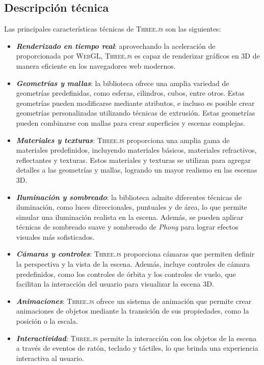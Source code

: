 \documentclass[a4paper, 11pt]{book}
\begin{document}
\subsection{Descripción técnica}
Las principales características técnicas de \textsc{Three.js} son las siguientes:
\begin{itemize}
	\item \textbf{\emph{Renderizado en tiempo real}}: aprovechando la aceleración de \emph{} proporcionada por \textsc{WebGL}, \textsc{Three.js} es capaz de renderizar gráficos en \textsc{3D} de manera eficiente en los navegadores web modernos.
	\item \textbf{\emph{Geometrías y mallas}}: la biblioteca ofrece una amplia variedad de geometrías predefinidas, como esferas, cilindros, cubos, entre otros. Estas geometrías pueden modificarse mediante atributos, e incluso es posible crear geometrías personalizadas utilizando técnicas de extrusión. Estas geometrías pueden combinarse con mallas para crear superficies y escenas complejas.
	\item \textbf{\emph{Materiales y texturas}}: \textsc{Three.js} proporciona una amplia gama de materiales predefinidos, incluyendo materiales básicos, materiales refractivos, reflectantes y texturas. Estos materiales y texturas se utilizan para agregar detalles a las geometrías y mallas, logrando un mayor realismo en las escenas \textsc{3D}.
	\item \textbf{\emph{Iluminación y sombreado}}: la biblioteca admite diferentes técnicas de iluminación, como luces direccionales, puntuales y de área, lo que permite simular una iluminación realista en la escena. 
	Además, se pueden aplicar técnicas de sombreado suave y sombreado de \emph{Phong} para lograr efectos visuales más sofisticados.
	\item \textbf{\emph{Cámaras y controles}}: \textsc{Three.js} proporciona cámaras que permiten definir la perspectiva y la vista de la escena. Además, incluye controles de cámara predefinidos, como los controles de órbita y los controles de vuelo, que facilitan la interacción del usuario para visualizar la escena \textsc{3D}.
	\item \textbf{\emph{Animaciones}}: \textsc{Three.js} ofrece un sistema de animación que permite crear animaciones de objetos mediante la transición de sus propiedades, como la posición o la escala.
	\item \textbf{\emph{Interactividad}}: \textsc{Three.js} permite la interacción con los objetos de la escena a través de eventos de ratón, teclado y táctiles, lo que brinda una experiencia interactiva al usuario.
\end{itemize}
\end{document}
